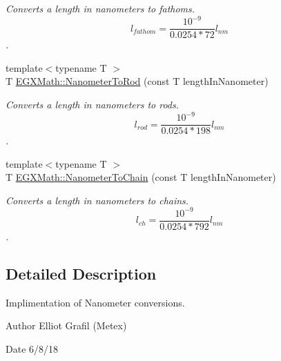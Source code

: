 \begin{DoxyCompactItemize}
\begin{DoxyCompactList}\small\item\em Converts a length in nanometers to fathoms. \[ l_{fathom}= \frac{10^{-9}}{0.0254 * 72} l_{nm} \]. \end{DoxyCompactList}\item 
{\footnotesize template$<$typename T $>$ }\\T \mbox{\hyperlink{group___e_g_x_math-_conversions-_length_conversions-_s_i-_nanometer-_surveyors_ga4677e0e0b8662f3786f43cea2f76e8d9}{E\+G\+X\+Math\+::\+Nanometer\+To\+Rod}} (const T length\+In\+Nanometer)
\begin{DoxyCompactList}\small\item\em Converts a length in nanometers to rods. \[ l_{rod}= \frac{10^{-9}}{0.0254 * 198} l_{nm} \]. \end{DoxyCompactList}\item 
{\footnotesize template$<$typename T $>$ }\\T \mbox{\hyperlink{group___e_g_x_math-_conversions-_length_conversions-_s_i-_nanometer-_surveyors_ga8da91a669cbde463135b21d48ffbdedc}{E\+G\+X\+Math\+::\+Nanometer\+To\+Chain}} (const T length\+In\+Nanometer)
\begin{DoxyCompactList}\small\item\em Converts a length in nanometers to chains. \[ l_{ch}= \frac{10^{-9}}{0.0254 * 792} l_{nm} \]. \end{DoxyCompactList}\end{DoxyCompactItemize}


\subsection{Detailed Description}
Implimentation of Nanometer conversions. 

\begin{DoxyAuthor}{Author}
Elliot Grafil (Metex) 
\end{DoxyAuthor}
\begin{DoxyDate}{Date}
6/8/18 
\end{DoxyDate}
